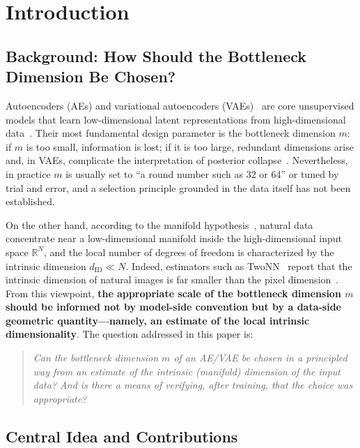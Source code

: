 \documentclass[make,article,submit,pdftex,moreauthors]{Definitions/mdpi}
\newcommand{\dID}{d_{\mathrm{ID}}}
\newcommand{\R}{\mathbb{R}}
\begin{document}
\section{Introduction}\label{sec:intro}

\subsection{Background: How Should the Bottleneck Dimension Be Chosen?}\label{sec:intro_bg}

Autoencoders (AEs) and variational autoencoders
(VAEs)~\cite{kingma2014vae} are core unsupervised models that learn
low-dimensional latent representations from high-dimensional
data~\cite{bengio2013representation}.
Their most fundamental design parameter is the bottleneck dimension $m$:
if $m$ is too small, information is lost; if it is too large, redundant
dimensions arise and, in VAEs, complicate the interpretation of posterior
collapse~\cite{lucas2019elbo}.
Nevertheless, in practice $m$ is usually set to ``a round number such as 32
or 64'' or tuned by trial and error, and a selection principle grounded in
the data itself has not been established.

On the other hand, according to the manifold
hypothesis~\cite{fefferman2016manifold}, natural data concentrate near a
low-dimensional manifold inside the high-dimensional input space $\R^N$,
and the local number of degrees of freedom is characterized by the intrinsic
dimension $\dID \ll N$.
Indeed, estimators such as TwoNN~\cite{facco2017twonn} report that the
intrinsic dimension of natural images is far smaller than the pixel
dimension~\cite{pope2021intrinsic}.
From this viewpoint, \textbf{the appropriate scale of the bottleneck
dimension $m$ should be informed not by model-side convention but by a
data-side geometric quantity---namely, an estimate of the local intrinsic
dimensionality}.
The question addressed in this paper is:
\begin{quote}
\textit{Can the bottleneck dimension $m$ of an AE/VAE be chosen in a
principled way from an estimate of the intrinsic (manifold) dimension of the
input data?
And is there a means of verifying, after training, that the choice was
appropriate?}
\end{quote}

\subsection{Central Idea and Contributions}\label{sec:intro_aim}
\end{document}
